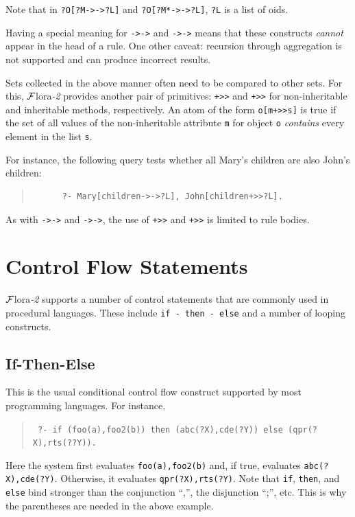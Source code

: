 \documentclass[11pt]{article}
\newcommand{\FLORA}{{\mbox{\sc ${\cal F}${lora}\rm\emph{-2}}}\xspace}
\begin{document}
\noindent
Note that in {\tt ?O[?M->->?L]}  and {\tt ?O[?M*->->?L]}, {\tt ?L} is a list of oids.

Having a special meaning for {\tt ->->} and {\tt *->->} means that these
constructs \emph{cannot} appear in the head of a rule.
One other caveat: recursion through aggregation is not supported and can
produce incorrect results.



\index{\tt +>>}
\index{\tt *+>>}
Sets collected in the above manner often  need to be compared to other
sets. For this, \FLORA provides another pair of primitives: {\tt +>>} and
{\tt *+>>} for non-inheritable and inheritable methods, respectively.
An atom of the form {\tt o[m+>>s]} is true if the set of all values of the
non-inheritable attribute {\tt m} for object {\tt o} \emph{contains} every
element in the list {\tt s}. 

For instance, the following query tests whether all Mary's children are
also John's children:
\begin{quote}
\begin{verbatim}
      ?- Mary[children->->?L], John[children+>>?L].
\end{verbatim}
\end{quote}

As with {\tt ->->} and {\tt *->->},
the use of {\tt +>>} and {\tt *+>>} is limited to rule bodies.


\section{Control Flow Statements}\label{sec:control}

\FLORA supports a number of control statements that are commonly used in
procedural languages. These include {\tt if - then - else} and 
a number of looping constructs.

\subsection{If-Then-Else}
This is the usual conditional control flow
construct supported by most programming languages.  For instance,
\begin{quote}
 \tt
       ?- if (foo(a),foo2(b)) then (abc(?X),cde(?Y)) else (qpr(?X),rts(??Y)).
\end{quote}
Here the system first evaluates {\tt foo(a),foo2(b)} and, if true,
evaluates {\tt abc(?X),cde(?Y)}. Otherwise, it evaluates {\tt qpr(?X),rts(?Y)}.
Note that {\tt if}, {\tt then}, and {\tt else}
bind stronger than the conjunction ``,'', the
disjunction ``;'', etc. This is why the parentheses are needed in the above
example.
\end{document}

